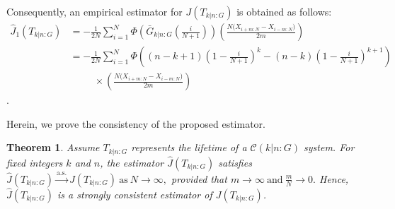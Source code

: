\documentclass[12pt,a4paper]{article}
\numberwithin{equation}{section}
\newtheorem{theorem}{Theorem}[section]
\begin{document}
Consequently, an empirical estimator for
$J(T_{k|n:G})$
is obtained as follows:
\begin{align}\label{eq3.1}
    \hat J_1(T_{k|n:G})&=-\frac{1}{2N}\sum_{i=1}^N\Phi\left(\bar G_{k|n:G}\left(\frac{i}{N+1}\right)\right)\left(\frac{N\bigl(X_{i+m:N}-X_{i-m:N}\bigr)}{2m}\right)\nonumber\\
    &=-\frac{1}{2N}\sum_{i=1}^N\Phi\left((n-k+1)\left(1-\frac{i}{N+1}\right)^k-(n-k)\left(1-\frac{i}{N+1}\right)^{k+1}\right)\nonumber\\&~~~~~~~~~~~\times\left(\frac{N\bigl(X_{i+m:N}-X_{i-m:N}\bigr)}{2m}\right)
\end{align}.

Herein, we prove the consistency of the proposed estimator.
\begin{theorem}
Assume $T_{k|n:G}$ represents the lifetime of a  $\mathcal C(k|n{:}G)$ system. For fixed integers $k$ and $n$, the estimator $\widehat J(T_{k|n:G})$
satisfies $\widehat J(T_{k|n:G})
\xrightarrow{\text{a.s.}} J(T_{k|n:G})~ \text{as}~ N\to\infty,$
provided that $m\to\infty
~\text{and}~
\frac{m}{N}\to0.$
Hence, $\widehat{J}(T_{k|n:G})$ is a strongly consistent estimator of
$J(T_{k|n:G})$.
\end{theorem}
\end{document}

